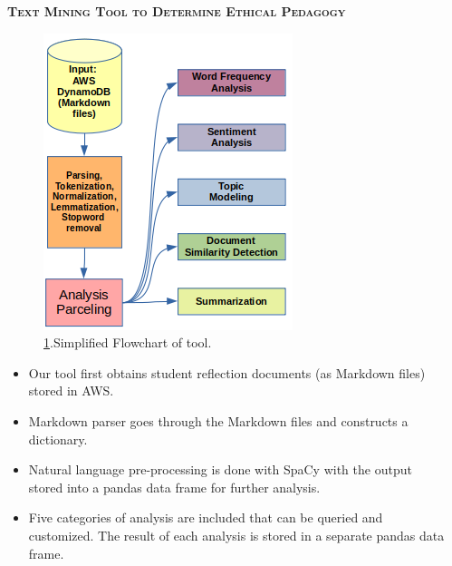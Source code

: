 \documentclass[final,t]{beamer}
\begin{document}
\begin{frame}{}
\begin{columns}
\begin{column}{.5\linewidth}
			\begin{block}{\textsc{\textbf{Text Mining Tool to Determine Ethical Pedagogy}}}
			\begin{center}
				\begin{center} \end{center} %
				\begin{figure}
					\includegraphics[scale = 3.6]{graphics/flowchart.png}
					\caption{\ref{fig:flowchart}.Simplified Flowchart of tool.}
					\label{fig:flowchart}
				\end{figure}
			\end{center}

				\begin{itemize}
					\item  Our tool first obtains student reflection documents (as Markdown files) stored in AWS.
					\item  Markdown parser goes through the Markdown files and constructs a dictionary.
					\item  Natural language pre-processing is done with SpaCy with the output stored into a pandas data frame for further analysis.
					\item Five categories of analysis are included that can be queried and customized. The result of each analysis is stored in a separate pandas data frame. 
				\end{itemize}
			\vspace*{3mm}
                \end{block}


	\end{column}

%
%
	\begin{column}{.5\linewidth}
%
%
%



\end{column}
\end{columns}
\end{frame}
\end{document}
